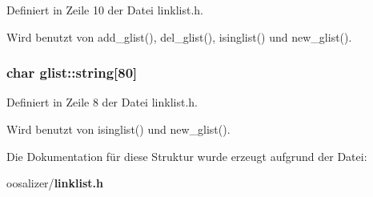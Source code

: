 Definiert in Zeile 10 der Datei linklist.h.

Wird benutzt von add\_\-glist(), del\_\-glist(), isinglist() und new\_\-glist().
\subsubsection{\setlength{\rightskip}{0pt plus 5cm}char {\bf glist::string}[80]}\label{structglist_36312d3b785bc51f116bd01aa2a3cf20}




Definiert in Zeile 8 der Datei linklist.h.

Wird benutzt von isinglist() und new\_\-glist().

Die Dokumentation f\"{u}r diese Struktur wurde erzeugt aufgrund der Datei:\begin{CompactItemize}
\item 
oosalizer/{\bf linklist.h}\end{CompactItemize}

